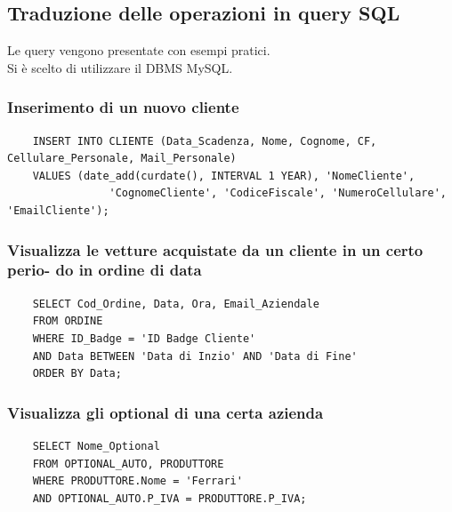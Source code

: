 \documentclass[12pt]{article}
\begin{document}
\subsection{Traduzione delle operazioni in query SQL}

Le query vengono presentate con esempi pratici.\\
Si è scelto di utilizzare il DBMS MySQL.

\lstset{style=sqlStyle}

\subsubsection*{Inserimento di un nuovo cliente}

\begin{lstlisting}
    INSERT INTO CLIENTE (Data_Scadenza, Nome, Cognome, CF, Cellulare_Personale, Mail_Personale)
    VALUES (date_add(curdate(), INTERVAL 1 YEAR), 'NomeCliente', 
                'CognomeCliente', 'CodiceFiscale', 'NumeroCellulare', 'EmailCliente');
\end{lstlisting}

\subsubsection*{Visualizza le vetture acquistate da un cliente in un certo perio-
do in ordine di data}

\begin{lstlisting}
    SELECT Cod_Ordine, Data, Ora, Email_Aziendale 
    FROM ORDINE
    WHERE ID_Badge = 'ID Badge Cliente' 
    AND Data BETWEEN 'Data di Inzio' AND 'Data di Fine'
    ORDER BY Data;
\end{lstlisting}

\subsubsection*{Visualizza gli optional di una certa azienda}
\begin{lstlisting}
    SELECT Nome_Optional
    FROM OPTIONAL_AUTO, PRODUTTORE
    WHERE PRODUTTORE.Nome = 'Ferrari'
    AND OPTIONAL_AUTO.P_IVA = PRODUTTORE.P_IVA;
\end{lstlisting}
\end{document}
